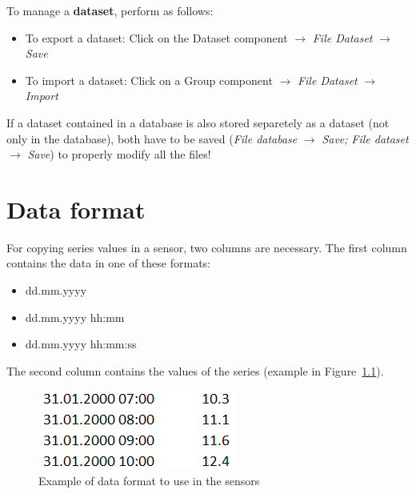 \documentclass[
  letterpaper,
  DIV=11,
  numbers=noendperiod]{scrreprt}
\begin{document}
To manage a \textbf{dataset}, perform as follows:

\begin{itemize}
\item
  {To export a dataset: Click on the Dataset component \(\rightarrow\)
  \emph{File Dataset} \(\rightarrow\) \emph{Save}}
\item
  {To import a dataset: Click on a Group component \(\rightarrow\)
  \emph{File Dataset} \(\rightarrow\) \emph{Import}}
\end{itemize}

If a dataset contained in a database is also stored separetely as a
dataset (not only in the database), both have to be saved (\emph{File
database} \(\rightarrow\) \emph{Save;} \emph{File dataset}
\(\rightarrow\) \emph{Save}) to properly modify all the files!

\hypertarget{data-format}{%
\chapter{Data format}\label{data-format}}

For copying series values in a sensor, two columns are necessary. The
first column contains the data in one of these formats:

\begin{itemize}
\item
  dd.mm.yyyy
\item
  dd.mm.yyyy hh:mm
\item
  dd.mm.yyyy hh:mm:ss
\end{itemize}

The second column contains the values of the series (example in
Figure~\ref{fig-example_data_format_sensors}).

\begin{figure}

{\centering \includegraphics{./figures/fig-example_data_format_sensors.png}

}

\caption{\label{fig-example_data_format_sensors}Example of data format
to use in the sensors}

\end{figure}
\end{document}
